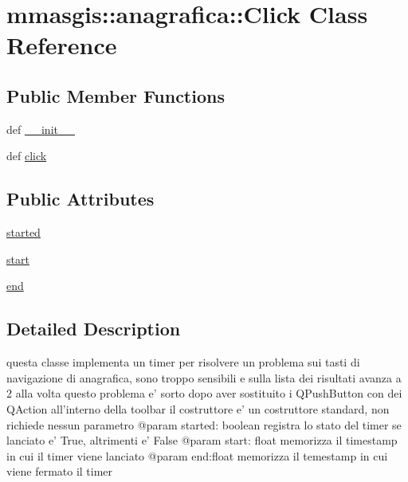 \hypertarget{classmmasgis_1_1anagrafica_1_1Click}{
\section{mmasgis::anagrafica::Click Class Reference}
\label{classmmasgis_1_1anagrafica_1_1Click}
}
\subsection*{Public Member Functions}
\begin{DoxyCompactItemize}
\item 
def \hyperlink{classmmasgis_1_1anagrafica_1_1Click_aafa2a1e55f9ee39e80c63e5bd1e5c1ef}{\_\-\_\-init\_\-\_\-}
\item 
def \hyperlink{classmmasgis_1_1anagrafica_1_1Click_a7424e0b7d24e93fab3cd69277c1196b5}{click}
\end{DoxyCompactItemize}
\subsection*{Public Attributes}
\begin{DoxyCompactItemize}
\item 
\hyperlink{classmmasgis_1_1anagrafica_1_1Click_ad42df0a202340a69ad009068d360d006}{started}
\item 
\hyperlink{classmmasgis_1_1anagrafica_1_1Click_a7d313410095a4552b247fe70b99c442f}{start}
\item 
\hyperlink{classmmasgis_1_1anagrafica_1_1Click_a8a95c44c19f799cc8082faae9331c566}{end}
\end{DoxyCompactItemize}


\subsection{Detailed Description}
\begin{DoxyVerb}
 questa classe implementa un timer
 per risolvere un problema sui tasti di navigazione di anagrafica, sono troppo sensibili  e sulla lista dei risultati avanza a 2 alla volta
 questo problema e' sorto dopo aver sostituito i QPushButton con dei QAction all'interno della toolbar
 il costruttore e' un costruttore standard, non richiede nessun parametro
 @param started: boolean registra lo stato del timer se lanciato e' True, altrimenti e' False
 @param start: float memorizza il timestamp in cui il timer viene lanciato
 @param end:float memorizza il temestamp in cui viene fermato il timer   
\end{DoxyVerb}
 

